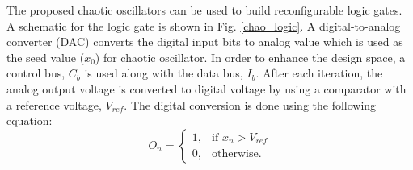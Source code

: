 \documentclass[conference]{IEEEtran}
\begin{document}
The proposed chaotic oscillators can be used to build reconfigurable logic gates. A schematic for the logic gate is shown in Fig. \ref{chao_logic}. A digital-to-analog converter (DAC) converts the digital input bits to analog value which is used as the seed value ($x_0$) for chaotic oscillator. In order to enhance the design space, a control bus, $C_b$ is used along with the data bus, $I_b$. After each iteration, the analog output voltage is converted to digital voltage by using a comparator with a reference voltage, $V_{ref}$. The digital conversion is done using the following equation:
\begin{equation}
O_n=
\begin{cases}
1,&\text{if } x_{n} > V_{ref}\\
0,&\text{otherwise.}
\end{cases}
\end{equation}
\end{document}

